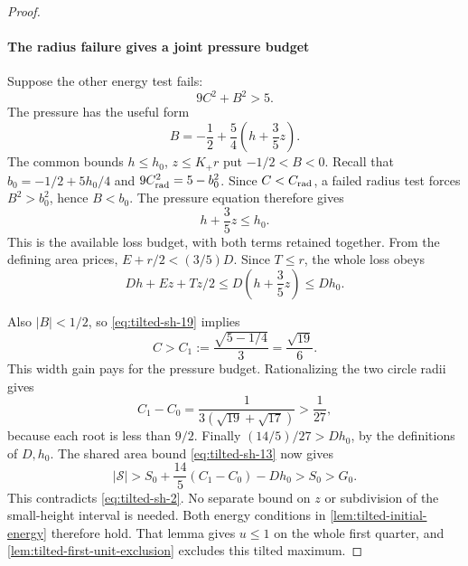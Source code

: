 \begin{proof}
\paragraph{The radius failure gives a joint pressure budget}

Suppose the other energy test fails:
\begin{equation}\label{eq:tilted-sh-19}
9C^2+B^2>5.
\end{equation}
The pressure has the useful form
\[
B=-\frac12+\frac54\left(h+\frac35z\right).
\]
The common bounds \(h\le h_0\), \(z\le K_+r\) put
\(-1/2<B<0\). Recall that
\(b_0=-1/2+5h_0/4\) and \(9C_{\rm rad}^2=5-b_0^2\).
Since \(C<C_{\rm rad}\), a failed radius test forces
\(B^2>b_0^2\), hence \(B<b_0\). The pressure equation therefore gives
\begin{equation}\label{eq:tilted-sh-21}
\boxed{h+\frac35z\le h_0.}
\end{equation}
This is the available loss budget, with both terms retained together.
From the defining area prices,
\(E+r/2<(3/5)D\). Since \(T\le r\), the whole loss obeys
\begin{equation}\label{eq:tilted-sh-22}
Dh+Ez+Tz/2\le D\left(h+\frac35z\right)\le Dh_0.
\end{equation}

Also \(|B|<1/2\), so \eqref{eq:tilted-sh-19} implies
\begin{equation}\label{eq:tilted-sh-20}
C>C_1:=\frac{\sqrt{5-1/4}}3=\frac{\sqrt{19}}6.
\end{equation}
This width gain pays for the pressure budget. Rationalizing the two
circle radii gives
\[
C_1-C_0=\frac{1}{3(\sqrt{19}+\sqrt{17})}>\frac1{27},
\]
because each root is less than \(9/2\). Finally
\((14/5)/27>Dh_0\), by the definitions of \(D,h_0\).
The shared area bound \eqref{eq:tilted-sh-13} now gives
\begin{equation}\label{eq:tilted-sh-23}
|\mathcal S|>S_0+\frac{14}{5}(C_1-C_0)-Dh_0>S_0>G_0.
\end{equation}
This contradicts \eqref{eq:tilted-sh-2}. No separate bound on \(z\)
or subdivision of the small-height interval is needed.
Both energy conditions in \cref{lem:tilted-initial-energy} therefore
hold. That lemma gives $u\le1$ on the whole first quarter, and
\cref{lem:tilted-first-unit-exclusion} excludes this tilted maximum.
\end{proof}
